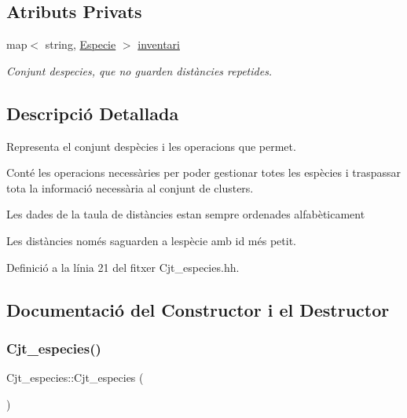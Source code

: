 \subsection*{Atributs Privats}
\begin{DoxyCompactItemize}
\item 
map$<$ string, \hyperlink{class_especie}{Especie} $>$ \hyperlink{class_cjt__especies_aa253bc335c8c8176b8ece5c49a15c5f3}{inventari}
\begin{DoxyCompactList}\small\item\em Conjunt d\textquotesingle{}especies, que no guarden distàncies repetides. \end{DoxyCompactList}\end{DoxyCompactItemize}


\subsection{Descripció Detallada}
Representa el conjunt d\textquotesingle{}espècies i les operacions que permet. 

Conté les operacions necessàries per poder gestionar totes les espècies i traspassar tota la informació necessària al conjunt de clusters.

Les dades de la taula de distàncies estan sempre ordenades alfabèticament

Les distàncies només s\textquotesingle{}aguarden a l\textquotesingle{}espècie amb id més petit. 

Definició a la línia 21 del fitxer Cjt\+\_\+especies.\+hh.



\subsection{Documentació del Constructor i el Destructor}
\mbox{\label{class_cjt__especies_ab297567c73ccd8caefbd8760d90294a1}} 
\subsubsection{\texorpdfstring{Cjt\+\_\+especies()}{Cjt\_especies()}}
{\footnotesize\ttfamily Cjt\+\_\+especies\+::\+Cjt\+\_\+especies (\begin{DoxyParamCaption}{ }\end{DoxyParamCaption})}




